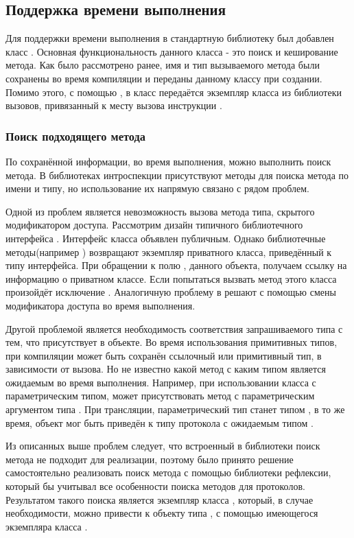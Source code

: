 \subsection{Поддержка времени выполнения} \label{runtime_info}
Для поддержки времени выполнения в стандартную библиотеку был добавлен класс . Основная функциональность данного класса - это поиск и кеширование метода. Как было рассмотрено ранее, имя и тип вызываемого метода были сохранены во время компиляции и переданы данному классу при создании. Помимо этого, с помощью , в класс передаётся экземпляр класса  из библиотеки вызовов, привязанный к месту вызова инструкции .

\subsubsection{Поиск подходящего метода}
По сохранённой информации, во время выполнения, можно выполнить поиск метода. В библиотеках интроспекции присутствуют методы для поиска метода по имени и типу, но использование их напрямую связано с рядом проблем.

Одной из проблем является невозможность вызова метода типа, скрытого модификатором доступа. Рассмотрим дизайн типичного библиотечного интерфейса . Интерфейс класса объявлен публичным. Однако библиотечные методы(например ) возвращают экземпляр приватного класса, приведённый к типу интерфейса. При обращении к полю , данного объекта, получаем ссылку на информацию о приватном классе. Если попытаться вызвать метод этого класса произойдёт исключение . Аналогичную проблему в  решают с помощью смены модификатора доступа во время выполнения.

Другой проблемой является необходимость соответствия запрашиваемого типа с тем, что присутствует в объекте. Во время использования примитивных типов, при компиляции может быть сохранён ссылочный или примитивный тип, в зависимости от вызова. Но не известно какой метод с каким типом является ожидаемым во время выполнения. Например, при использовании класса с параметрическим типом, может присутствовать метод с параметрическим аргументом типа . При трансляции, параметрический тип станет типом , в то же время, объект мог быть приведён к типу протокола с ожидаемым типом .

Из описанных выше проблем следует, что встроенный в библиотеки поиск метода не подходит для реализации, поэтому было принято решение самостоятельно реализовать поиск метода с помощью библиотеки рефлексии, который бы учитывал все особенности поиска методов для протоколов. Результатом такого поиска является экземпляр класса , который, в случае необходимости, можно привести к объекту типа , с помощью имеющегося экземпляра класса .


